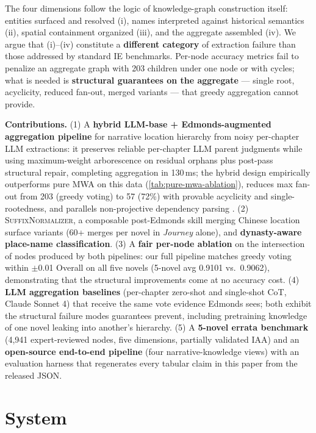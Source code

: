 \documentclass[11pt]{article}
\begin{document}
The four dimensions follow the logic of knowledge-graph construction itself: entities surfaced and resolved (i), names interpreted against historical semantics (ii), spatial containment organized (iii), and the aggregate assembled (iv). We argue that (i)--(iv) constitute a \textbf{different category} of extraction failure than those addressed by standard IE benchmarks. Per-node accuracy metrics fail to penalize an aggregate graph with 203 children under one node or with cycles; what is needed is \textbf{structural guarantees on the aggregate} --- single root, acyclicity, reduced fan-out, merged variants --- that greedy aggregation cannot provide.

\noindent\textbf{Contributions.} (1) A \textbf{hybrid LLM-base + Edmonds-augmented aggregation pipeline} \cite{chu1965,edmonds1967} for narrative location hierarchy from noisy per-chapter LLM extractions: it preserves reliable per-chapter LLM parent judgments while using maximum-weight arborescence on residual orphans plus post-pass structural repair, completing aggregation in 130\,ms; the hybrid design empirically outperforms pure MWA on this data (\autoref{tab:pure-mwa-ablation}), reduces max fan-out from 203 (greedy voting) to 57 (72\%) with provable acyclicity and single-rootedness, and parallels non-projective dependency parsing \cite{mcdonald2005}. (2) \textsc{SuffixNormalizer}, a composable post-Edmonds skill merging Chinese location surface variants (60+ merges per novel in \textit{Journey} alone), and \textbf{dynasty-aware place-name classification}. (3) A \textbf{fair per-node ablation} on the intersection of nodes produced by both pipelines: our full pipeline matches greedy voting within $\pm$0.01 Overall on all five novels (5-novel avg 0.9101 vs.\ 0.9062), demonstrating that the structural improvements come at no accuracy cost. (4) \textbf{LLM aggregation baselines} (per-chapter zero-shot and single-shot CoT, Claude Sonnet 4) that receive the same vote evidence Edmonds sees; both exhibit the structural failure modes guarantees prevent, including pretraining knowledge of one novel leaking into another's hierarchy. (5) A \textbf{5-novel errata benchmark} (4{,}941 expert-reviewed nodes, five dimensions, partially validated IAA) and an \textbf{open-source end-to-end pipeline} (four narrative-knowledge views) with an evaluation harness that regenerates every tabular claim in this paper from the released JSON.

\section{System}
\label{sec:system}
\end{document}
